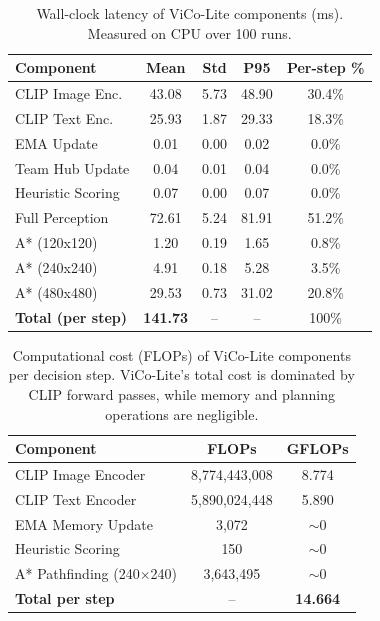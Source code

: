 \begin{table}[t]
\centering
\caption{Wall-clock latency of ViCo-Lite components (ms). Measured on CPU over 100 runs.}
\label{tab:wallclock}
\begin{tabular}{lcccc}
\toprule
\textbf{Component} & \textbf{Mean} & \textbf{Std} & \textbf{P95} & \textbf{Per-step \%} \\
\midrule
CLIP Image Enc. & 43.08 & 5.73 & 48.90 & 30.4\% \\
CLIP Text Enc. & 25.93 & 1.87 & 29.33 & 18.3\% \\
EMA Update & 0.01 & 0.00 & 0.02 & 0.0\% \\
Team Hub Update & 0.04 & 0.01 & 0.04 & 0.0\% \\
Heuristic Scoring & 0.07 & 0.00 & 0.07 & 0.0\% \\
Full Perception & 72.61 & 5.24 & 81.91 & 51.2\% \\
A* (120x120) & 1.20 & 0.19 & 1.65 & 0.8\% \\
A* (240x240) & 4.91 & 0.18 & 5.28 & 3.5\% \\
A* (480x480) & 29.53 & 0.73 & 31.02 & 20.8\% \\
\midrule
\textbf{Total (per step)} & \textbf{141.73} & -- & -- & 100\% \\
\bottomrule
\end{tabular}
\end{table}

\begin{table}[t]
\centering
\caption{Computational cost (FLOPs) of ViCo-Lite components per decision step. ViCo-Lite's total cost is dominated by CLIP forward passes, while memory and planning operations are negligible.}
\label{tab:flops}
\begin{tabular}{lcc}
\toprule
\textbf{Component} & \textbf{FLOPs} & \textbf{GFLOPs} \\
\midrule
CLIP Image Encoder & 8,774,443,008 & 8.774 \\
CLIP Text Encoder & 5,890,024,448 & 5.890 \\
EMA Memory Update & 3,072 & $\sim$0 \\
Heuristic Scoring & 150 & $\sim$0 \\
A* Pathfinding (240$\times$240) & 3,643,495 & $\sim$0 \\
\midrule
\textbf{Total per step} & -- & \textbf{14.664} \\
\bottomrule
\end{tabular}
\end{table}

